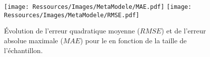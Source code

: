 
\begin{figure}
    \centering
    \texttt{[image: Ressources/Images/MetaModele/MAE.pdf]}
    \texttt{[image: Ressources/Images/MetaModele/RMSE.pdf]}
    \caption[Évolution de la fidélité des méta-modèles pour le ]
            {Évolution de l’erreur quadratique moyenne ($RMSE$) et de l’erreur absolue
             maximale ($MAE$) pour le  en fonction de la taille de
             l’échantillon.}
    \label{fig:mae_rmse_ssc}
\end{figure}


